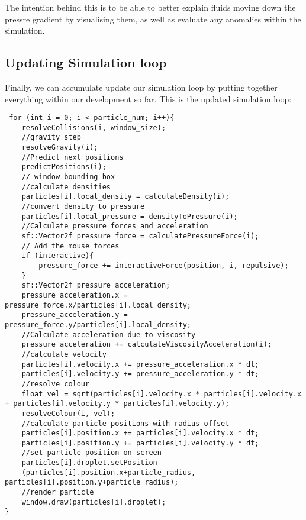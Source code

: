 \documentclass[write-up.tex]{subfiles}
\begin{document}
The intention behind this is to be able to better explain fluids moving down the pressre gradient by visualising them, as well as evaluate any anomalies within the simulation.
\subsection{Updating Simulation loop}
Finally, we can accumulate update our simulation loop by putting together everything within our development so far. This is the updated simulation loop:

\begin{lstlisting}
 for (int i = 0; i < particle_num; i++){
    resolveCollisions(i, window_size);
    //gravity step
    resolveGravity(i);
    //Predict next positions
    predictPositions(i);
    // window bounding box
    //calculate densities
    particles[i].local_density = calculateDensity(i);
    //convert density to pressure
    particles[i].local_pressure = densityToPressure(i);
    //Calculate pressure forces and acceleration
    sf::Vector2f pressure_force = calculatePressureForce(i);
    // Add the mouse forces
    if (interactive){
        pressure_force += interactiveForce(position, i, repulsive);
    }
    sf::Vector2f pressure_acceleration;
    pressure_acceleration.x = pressure_force.x/particles[i].local_density;
    pressure_acceleration.y = pressure_force.y/particles[i].local_density;
    //Calculate acceleration due to viscosity
    pressure_acceleration += calculateViscosityAcceleration(i);
    //calculate velocity
    particles[i].velocity.x += pressure_acceleration.x * dt;
    particles[i].velocity.y += pressure_acceleration.y * dt;
    //resolve colour
    float vel = sqrt(particles[i].velocity.x * particles[i].velocity.x + particles[i].velocity.y * particles[i].velocity.y);
    resolveColour(i, vel);
    //calculate particle positions with radius offset
    particles[i].position.x += particles[i].velocity.x * dt;
    particles[i].position.y += particles[i].velocity.y * dt;
    //set particle position on screen
    particles[i].droplet.setPosition
    (particles[i].position.x+particle_radius, particles[i].position.y+particle_radius);
    //render particle
    window.draw(particles[i].droplet);
}
\end{lstlisting}
\pagebreak
\end{document}

